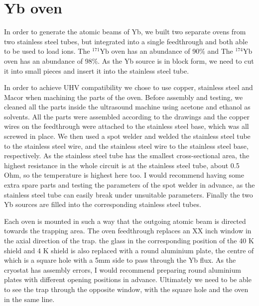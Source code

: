 \section{Yb oven}

In order to generate the atomic beams of Yb, we built two separate ovens from two stainless steel tubes, but integrated into a single feedthrough and both able to be used to load ions. The ${ }^{171} \mathrm{Yb}$ oven has an abundance of 90\% and The ${ }^{174} \mathrm{Yb}$ oven has an abundance of 98\%. As the Yb source is in block form, we need to cut it into small pieces and insert it into the stainless steel tube.

In order to achieve UHV compatibility we chose to use copper, stainless steel and Macor when machining the parts of the oven. Before assembly and testing, we cleaned all the parts inside the ultrasound machine using acetone and ethanol as solvents. All the parts were assembled according to the drawings and the copper wires on the feedthrough were attached to the stainless steel base, which was all screwed in place. We then used a spot welder and welded the stainless steel tube to the stainless steel wire, and the stainless steel wire to the stainless steel base, respectively. As the stainless steel tube has the smallest cross-sectional area, the highest resistance in the whole circuit is at the stainless steel tube, about 0.5 Ohm, so the temperature is highest here too. I would recommend having some extra spare parts and testing the parameters of the spot welder in advance, as the stainless steel tube can easily break under unsuitable parameters. Finally the two Yb sources are filled into the corresponding stainless steel tubes.

Each oven is mounted in such a way that the outgoing atomic beam is directed towards the trapping area. The oven feedthrough replaces an XX inch window in the axial direction of the trap. the glass in the corresponding position of the 40 K shield and 4 K shield is also replaced with a round aluminium plate, the centre of which is a square hole with a 5mm side to pass through the Yb flux. As the cryostat has assembly errors, I would recommend preparing round aluminium plates with different opening positions in advance. Ultimately we need to be able to see the trap through the opposite window, with the square hole and the oven in the same line.


